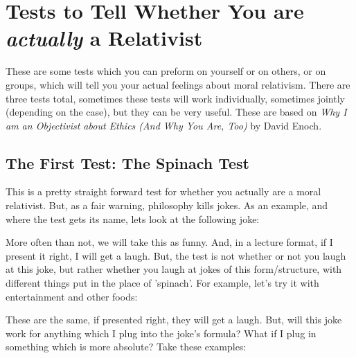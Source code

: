 \section{Tests to Tell Whether You are \emph{actually} a Relativist}
These are some tests which you can preform on yourself or on others, or on groups, which will tell you your actual feelings about moral relativism. There are three tests total, sometimes these tests will work individually, sometimes jointly (depending on the case), but they can be very useful. These are based on \emph{Why I am an Objectivist about Ethics (And Why You Are, Too)} 
by David Enoch\autocite{Enoch1}.

\subsection{The First Test: The Spinach Test}

This is a pretty straight forward test for whether you actually are a moral relativist. But, as a fair warning, philosophy kills jokes. As an example, and where the test gets its name, lets look at the following joke:


More often than not, we will take this as funny. And, in a lecture format, if I present it right, I will get a laugh. But, the test is not whether or not you laugh at this joke, but rather whether you laugh at jokes of this form/structure, with different things put in the place of 'spinach'. For example, let's try it with entertainment and other foods:


These are the same, if presented right, they will get a laugh. But, will this joke work for anything which I plug into the joke's formula? What if I plug in something which is more absolute? Take these examples:

